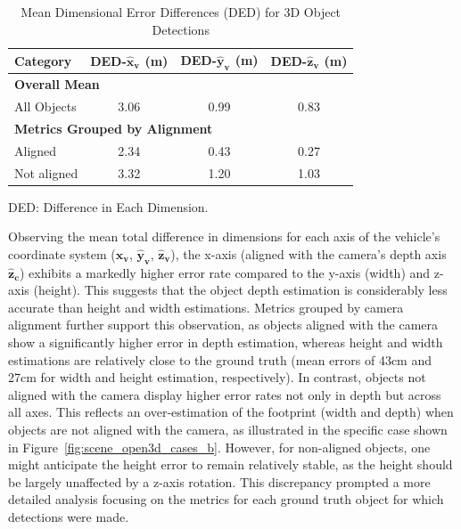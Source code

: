 \begin{table}[!ht]
    \centering
    \begin{tabular}{|l|c|c|c|}
        \hline
        \textbf{Category} & \textbf{DED-}$\mathbf{\hat{x}_v}$ (m) & \textbf{DED-}$\mathbf{\hat{y}_v}$ (m) & \textbf{DED-}$\mathbf{\hat{z}_v}$ (m) \\
        \hline
        
        \multicolumn{4}{|l|}{\textbf{Overall Mean}} \\
        \hline
        All Objects & 3.06 & 0.99 & 0.83 \\
        \hline

        \multicolumn{4}{|l|}{\textbf{Metrics Grouped by Alignment}} \\
        \hline
        Aligned & 2.34 & 0.43 & 0.27 \\
        Not aligned & 3.32 & 1.20 & 1.03 \\
        \hline
    \end{tabular}
    \begin{tablenotes}
        \item[] DED: Difference in Each Dimension.
    \end{tablenotes}
    \caption{Mean Dimensional Error Differences (DED) for 3D Object Detections}
    \label{tab:combined_ded_metrics}
\end{table}

Observing the mean total difference in dimensions for each axis of the vehicle's coordinate system ($\mathbf{\hat{x}_v}$, $\mathbf{\hat{y}_v}$, $\mathbf{\hat{z}_v}$), the x-axis (aligned with the camera's depth axis $\mathbf{\hat{z}_c}$) exhibits a markedly higher error rate compared to the y-axis (width) and z-axis (height). This suggests that the object depth estimation is considerably less accurate than height and width estimations. Metrics grouped by camera alignment further support this observation, as objects aligned with the camera show a significantly higher error in depth estimation, whereas height and width estimations are relatively close to the ground truth (mean errors of 43cm and 27cm for width and height estimation, respectively). In contrast, objects not aligned with the camera display higher error rates not only in depth but across all axes. This reflects an over-estimation of the footprint (width and depth) when objects are not aligned with the camera, as illustrated in the specific case shown in Figure~\ref{fig:scene_open3d_cases_b}.
However, for non-aligned objects, one might anticipate the height error to remain relatively stable, as the height should be largely unaffected by a z-axis rotation. This discrepancy prompted a more detailed analysis focusing on the metrics for each ground truth object for which detections were made.

